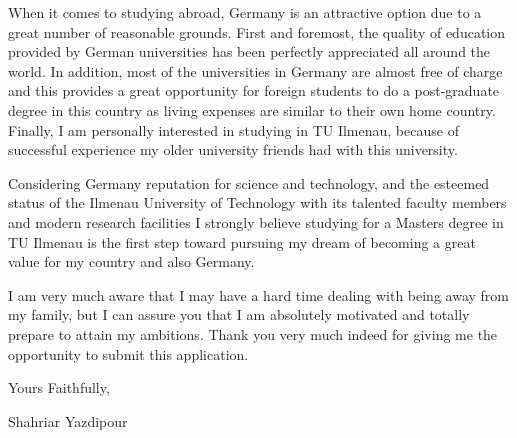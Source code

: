 \documentclass{article}
\begin{document}
When it comes to studying abroad, Germany is an attractive option due to a great number of reasonable grounds. First and foremost, the quality of education provided by German universities has been perfectly appreciated all around the world.
In addition, most of the universities in Germany are almost free of charge and this provides a great opportunity for foreign students to do a post-graduate degree in this country as living expenses are similar to their own home country. Finally, I am personally interested in studying in TU Ilmenau, because of successful experience my older university friends had with this university.

Considering Germany reputation for science and technology, and the esteemed status of the Ilmenau University of Technology with its talented faculty members and modern research facilities 
I strongly believe studying for a Masters degree in TU Ilmenau is the first step toward pursuing my dream of becoming a great value for my country and also Germany.

I am very much aware that I may have a hard time dealing with being away from my family, but I can assure you that I am absolutely motivated and totally prepare to attain my ambitions. Thank you very much indeed for giving me the opportunity to submit this application.

Yours Faithfully,

Shahriar Yazdipour
\end{document}
